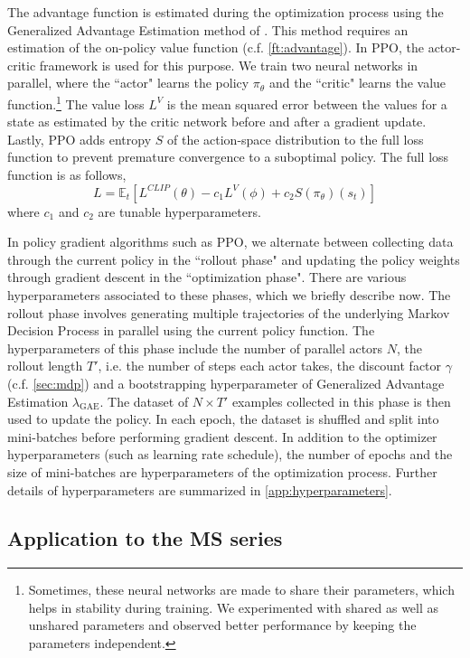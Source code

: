 The advantage function is estimated during the optimization process using the Generalized Advantage Estimation method of \cite{schulman2018highdimensional}.
This method requires an estimation of the on-policy value function (c.f. \autoref{ft:advantage}).
In PPO, the actor-critic framework is used for this purpose. We train two neural networks in parallel, where the ``actor" learns the policy $\pi_\theta$ and the ``critic" learns the value function.\footnote{
Sometimes, these neural networks are made to share their parameters, which helps in stability during training.
We experimented with shared as well as unshared parameters and observed better performance by keeping the parameters independent.}
The value loss $L^V$ is the mean squared error between the values for a state as estimated by the critic network before and after a gradient update.
Lastly, PPO adds entropy $S$ of the action-space distribution to the full loss function to prevent premature convergence to a suboptimal policy. The full loss function is as follows,
\[
L = \mathbb{E}_{t} \left[ L^{CLIP}(\theta) - c_1 L^{V}(\phi) + c_2 S(\pi_\theta)(s_t) \right]
\]
where $c_1$ and $c_2$ are tunable hyperparameters.

In policy gradient algorithms such as PPO, we alternate between collecting data through the current policy in the ``rollout phase" and updating the policy weights through gradient descent in the ``optimization phase". There are various hyperparameters associated to these phases, which we briefly describe now. The rollout phase involves generating multiple trajectories of the underlying Markov Decision Process in parallel using the current policy function.
The hyperparameters of this phase include the number of parallel actors $N$, the rollout length $T'$, i.e. the number of steps each actor takes, the discount factor $\gamma$ (c.f. \autoref{sec:mdp}) and a bootstrapping hyperparameter of Generalized Advantage Estimation $\lambda_{\text{GAE}}$. The dataset of $N \times T'$ examples collected in this phase is then used to update the policy. In each epoch, the dataset is shuffled and split into mini-batches before performing gradient descent.
In addition to the optimizer hyperparameters (such as learning rate schedule), the number of epochs and the size of mini-batches are hyperparameters of the optimization process.
Further details of hyperparameters are summarized in \autoref{app:hyperparameters}.

\subsection{Application to the MS series}\label{sec:application}

